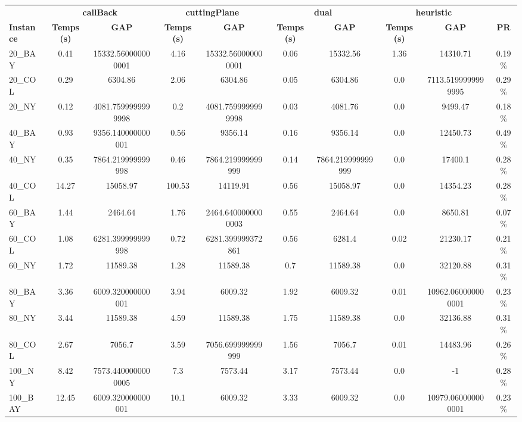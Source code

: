 \documentclass[main.tex]{subfiles}
\begin{document}
\begin{center}
\renewcommand{\arraystretch}{1.4} 
 \begin{tabular}{lccccccccc}
	\hline
 & \multicolumn{2}{c}{\textbf{callBack}} & \multicolumn{2}{c}{\textbf{cuttingPlane}} & \multicolumn{2}{c}{\textbf{dual}} & \multicolumn{2}{c}{\textbf{heuristic}}\\
\textbf{Instance}  & \textbf{Temps (s)} & \textbf{GAP} & \textbf{Temps (s)} & \textbf{GAP} & \textbf{Temps (s)} & \textbf{GAP} & \textbf{Temps (s)} & \textbf{GAP} & \textbf{PR} \\\hline

20\_BAY & 0.41 & 15332.560000000001 & 4.16 & 15332.560000000001 & 0.06 & 15332.56 & 1.36 & 14310.71 & 0.19\%\\
20\_COL & 0.29 & 6304.86 & 2.06 & 6304.86 & 0.05 & 6304.86 & 0.0 & 7113.5199999999995 & 0.29\%\\
20\_NY & 0.12 & 4081.7599999999998 & 0.2 & 4081.7599999999998 & 0.03 & 4081.76 & 0.0 & 9499.47 & 0.18\%\\
40\_BAY & 0.93 & 9356.140000000001 & 0.56 & 9356.14 & 0.16 & 9356.14 & 0.0 & 12450.73 & 0.49\%\\
40\_NY & 0.35 & 7864.219999999998 & 0.46 & 7864.219999999999 & 0.14 & 7864.219999999999 & 0.0 & 17400.1 & 0.28\%\\
40\_COL & 14.27 & 15058.97 & 100.53 & 14119.91 & 0.56 & 15058.97 & 0.0 & 14354.23 & 0.28\%\\
60\_BAY & 1.44 & 2464.64 & 1.76 & 2464.6400000000003 & 0.55 & 2464.64 & 0.0 & 8650.81 & 0.07\%\\
60\_COL & 1.08 & 6281.399999999998 & 0.72 & 6281.399999372861 & 0.56 & 6281.4 & 0.02 & 21230.17 & 0.21\%\\
60\_NY & 1.72 & 11589.38 & 1.28 & 11589.38 & 0.7 & 11589.38 & 0.0 & 32120.88 & 0.31\%\\
80\_BAY & 3.36 & 6009.320000000001 & 3.94 & 6009.32 & 1.92 & 6009.32 & 0.01 & 10962.060000000001 & 0.23\%\\
80\_NY & 3.44 & 11589.38 & 4.59 & 11589.38 & 1.75 & 11589.38 & 0.0 & 32136.88 & 0.31\%\\
80\_COL & 2.67 & 7056.7 & 3.59 & 7056.699999999999 & 1.56 & 7056.7 & 0.01 & 14483.96 & 0.26\%\\
100\_NY & 8.42 & 7573.4400000000005 & 7.3 & 7573.44 & 3.17 & 7573.44 & 0.0 & -1 & 0.28\%\\
100\_BAY & 12.45 & 6009.320000000001 & 10.1 & 6009.32 & 3.33 & 6009.32 & 0.0 & 10979.060000000001 & 0.23\%\\

\end{tabular}
\end{center}
\end{document}
